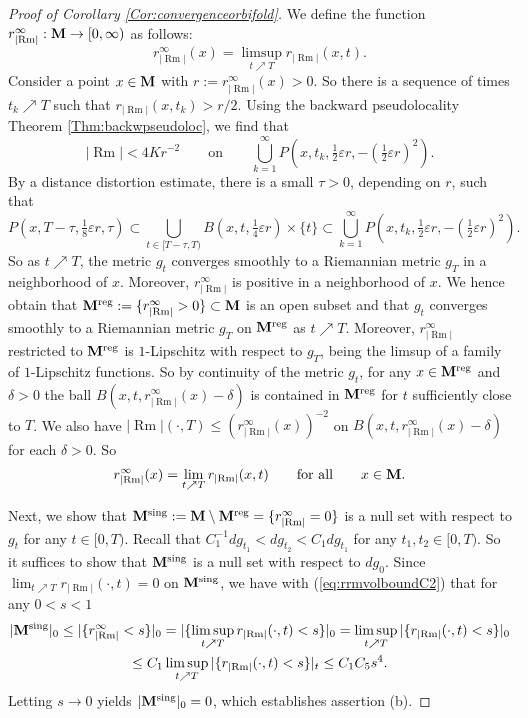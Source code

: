 \documentclass[11pt]{amsart}
\numberwithin{equation}{section}
\def\eps{\varepsilon}
\def\M{{\bf M}}
\def\eps{\varepsilon}
\DeclareMathOperator{\Rm}{Rm}
\newcommand{\rrm}{r_{|{\Rm}|}}
\numberwithin{equation}{section}
\begin{document}
\begin{proof}[Proof of Corollary \ref{Cor:convergenceorbifold}]
We define the function $\rrm^\infty : \M \to [0, \infty)$ as follows:
\[ \rrm^\infty (x) = \limsup_{t \nearrow T} \rrm (x,t). \]
Consider a point $x \in \M$ with $r := \rrm^\infty (x) > 0$.
So there is a sequence of times $t_k \nearrow T$ such that $\rrm (x, t_k) > r /2$.
Using the backward pseudolocality Theorem \ref{Thm:backwpseudoloc}, we find that
\[ |{\Rm}| < 4 Kr^{-2} \qquad \text{on} \qquad  \bigcup_{k=1}^\infty P(x,t_k, \tfrac12 \eps r, - (\tfrac12 \eps r)^2). \]
By a distance distortion estimate, there is a small $\tau > 0$, depending on $r$, such that
\[ P (x,T-\tau, \tfrac18 \eps r, \tau) \subset \bigcup_{t \in [T-\tau, T)} B(x,t, \tfrac14 \eps r) \times \{ t \} \subset  \bigcup_{k=1}^\infty P(x,t_k, \tfrac12 \eps r, - (\tfrac12 \eps r)^2). \]
So as $t \nearrow T$, the metric $g_t$ converges smoothly to a Riemannian metric $g_T$ in a neighborhood of $x$.
Moreover, $\rrm^\infty$ is positive in a neighborhood of $x$.
We hence obtain that $\M^{\textnormal{reg}} := \{ \rrm^\infty > 0 \} \subset \M$ is an open subset and that $g_t$ converges smoothly to a Riemannian metric $g_T$ on $\M^{\textnormal{reg}}$ as $t \nearrow T$.
Moreover, $\rrm^\infty$ restricted to $\M^{\textnormal{reg}}$ is $1$-Lipschitz with respect to $g_T$, being the limsup of a family of $1$-Lipschitz functions.
So by continuity of the metric $g_t$, for any $x \in \M^{\textnormal{reg}}$ and $\delta > 0$ the ball $B(x,t,\rrm^\infty(x) - \delta)$ is contained in $\M^{\textnormal{reg}}$ for $t$ sufficiently close to $T$.
We also have $|{\Rm}| (\cdot, T) \leq (\rrm^\infty (x))^{-2}$ on $B(x,t,\rrm^\infty(x) - \delta)$ for each $\delta > 0$.
So 
\[ \rrm^\infty (x) = \lim_{t \nearrow T} \rrm (x,t) \qquad \text{for all} \qquad x \in \M. \]

Next, we show that $\M^{\textnormal{sing}} := \M \setminus \M^{\textnormal{reg}} = \{ \rrm^\infty = 0 \}$ is a null set with respect to $g_t$ for any $t \in [0,T)$.
Recall that $C_1^{-1} dg_{t_1} < dg_{t_2} < C_1 dg_{t_1}$ for any $t_1, t_2 \in [0, T)$.
So it suffices to show that $\M^{\textnormal{sing}}$ is a null set with respect to $dg_0$.
Since $\lim_{t \nearrow T} \rrm (\cdot, t) = 0$ on $\M^{\textnormal{sing}}$, we have with (\ref{eq:rrmvolboundC2}) that for any $0 < s < 1$
\begin{multline*}
 |\M^{\textnormal{sing}} |_0 \leq |\{ \rrm^\infty < s \} |_0 =  |\{ \limsup_{t \nearrow T} \rrm (\cdot, t) < s \}|_0 = \limsup_{t \nearrow T} |\{\rrm (\cdot, t) < s \}|_0 \\
 \leq C_1 \limsup_{t \nearrow T} |\{\rrm (\cdot, t) < s \}|_t \leq C_1 C_5 s^4.
\end{multline*}
Letting $s \to 0$ yields $|\M^{\textnormal{sing}}|_0 = 0$, which establishes assertion (b).


\end{proof}
\end{document}
